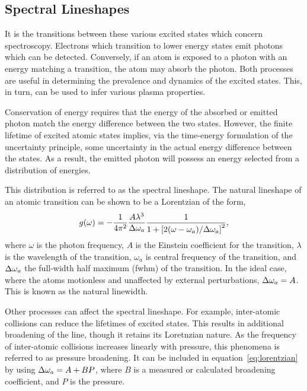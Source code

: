 \subsection{Spectral Lineshapes}

It is the transitions between these various excited states which concern
spectroscopy. Electrons which transition to lower energy states emit photons
which can be detected. Conversely, if an atom is exposed to a photon with an
energy matching a transition, the atom may absorb the photon. Both processes are
useful in determining the prevalence and dynamics of the excited states. This,
in turn, can be used to infer various plasma properties.

Conservation of energy requires that the energy of the absorbed or emitted
photon match the energy difference between the two states. However, the finite
lifetime of excited atomic states implies, via the time-energy formulation of
the uncertainty principle, some uncertainty in the actual energy difference
between the states. As a result, the emitted photon will possess an energy
selected from a distribution of energies.

This distribution is referred to as the spectral lineshape. The natural
lineshape of an atomic transition can be shown \cite{Siegman1986} to be a
Lorentzian of the form,
\begin{equation}
  g(\omega) = -\frac{1}{4\pi^2}\frac{A\lambda^3}{\Delta \omega_a}
  \frac{1}{1 + \left[2(\omega-\omega_a)/\Delta \omega_a\right]^2},
  \label{eq:lorentzian}
\end{equation}
where $\omega$ is the photon frequency, $A$ is the Einstein coefficient for the
transition, $\lambda$ is the wavelength of the transition, $\omega_a$ is central
frequency of the transition, and $\Delta \omega_a$ the full-width half maximum (\acs{fwhm})
of the transition. In the ideal case, where the atoms motionless and unaffected
by external perturbations, $\Delta \omega_a = A$. This is known as the natural linewidth.

Other processes can affect the spectral lineshape. For example, inter-atomic
collisions can reduce the lifetimes of excited states. This results in
additional broadening of the line, though it retains its Loretnzian nature. As
the frequency of inter-atomic collisions increases linearly with pressure, this
phenomena is referred to as pressure broadening. It can be included in
equation~\ref{eq:lorentzian} by using $\Delta \omega_a = A + BP$, where $B$ is a measured
or calculated broadening coefficient, and $P$ is the pressure.

